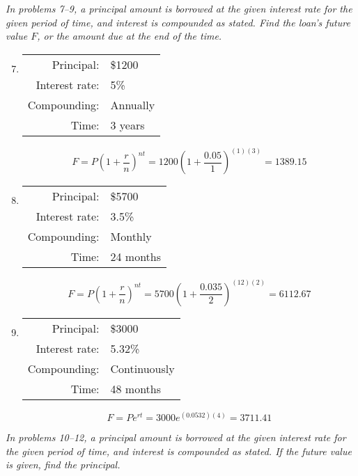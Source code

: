 \emph{In problems 7--9, a principal amount is borrowed at the given interest rate for the given period of time, and interest is compounded as stated.  Find the loan's future value $F$, or the amount due at the end of the time.}

\begin{enumerate}
\setcounter{enumi}{6}
\item \begin{tabular}{r l}
Principal: & \$1200\\
Interest rate: & 5\%\\
Compounding: & Annually\\
Time: & 3 years
\end{tabular} 
\[F = P\left(1 + \dfrac{r}{n}\right)^{nt} = 1200\left(1 + \dfrac{0.05}{1}\right)^{(1)(3)} = 1389.15\]

\item \begin{tabular}{r l}
Principal: & \$5700\\
Interest rate: & 3.5\%\\
Compounding: & Monthly\\
Time: & 24 months
\end{tabular} 
\[F = P\left(1 + \dfrac{r}{n}\right)^{nt} = 5700\left(1 + \dfrac{0.035}{2}\right)^{(12)(2)} = 6112.67\]

\item \begin{tabular}{r l}
Principal: & \$3000\\
Interest rate: & 5.32\%\\
Compounding: & Continuously\\
Time: & 48 months
\end{tabular} 
\[F = Pe^{rt} = 3000e^{(0.0532)(4)} = 3711.41\]
\end{enumerate}

\emph{In problems 10--12, a principal amount is borrowed at the given interest rate for the given period of time, and interest is compounded as stated.  If the future value is given, find the principal.}

